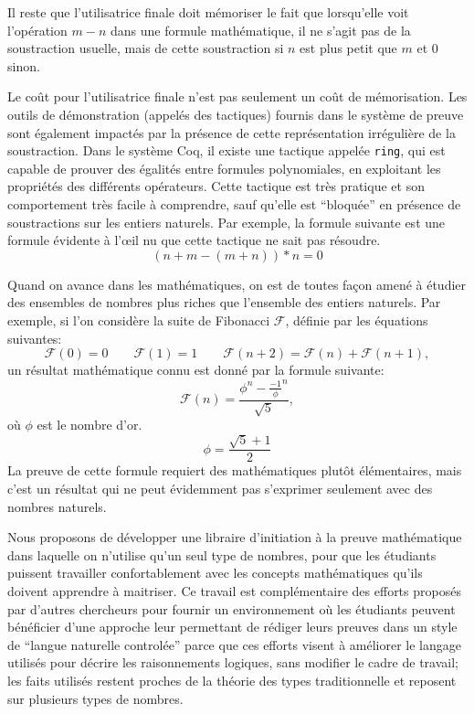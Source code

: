 \documentclass[draft]{jflart}
\begin{document}
Il reste que l'utilisatrice finale doit mémoriser le fait que
lorsqu'elle voit l'opération \(m - n\) dans une formule mathématique,
il ne s'agit pas de la soustraction usuelle, mais de cette
soustraction si \(n\) est plus petit que \(m\) et 0 sinon.

Le coût pour l'utilisatrice finale n'est pas seulement un coût de
mémorisation.  Les outils de démonstration (appelés des tactiques)
fournis dans le système de preuve sont également impactés par la
présence de cette représentation irrégulière de la soustraction.
Dans le système Coq, il existe une tactique appelée \texttt{ring}, qui
est capable de prouver des égalités entre formules polynomiales, en
exploitant les propriétés des différents opérateurs.  Cette tactique
est très pratique et son comportement très facile à comprendre, sauf
qu'elle est ``bloquée'' en présence de soustractions sur les entiers
naturels.  Par exemple, la formule suivante est une formule évidente à
l'œil nu que cette tactique ne sait pas résoudre.
\[(n + m - (m + n)) * n = 0\]

Quand on avance dans les mathématiques, on est de toutes façon amené à
étudier des ensembles de nombres plus riches que l'ensemble des
entiers naturels.  Par exemple, si l'on considère la suite de
Fibonacci \({\mathcal F}\), définie par les équations suivantes:
\[{\mathcal F}(0) = 0 \qquad {\mathcal F}(1)= 1\qquad {\mathcal F}(n +
2) = {\mathcal F}(n) + {\mathcal F}(n + 1),\]
un résultat mathématique connu est donné par la formule suivante:
\[{\mathcal F} (n) = \frac{\phi ^n - {\frac{-1}{\phi}} ^
  n}{\sqrt{5}},\]
où \(\phi\) est le nombre d'or.
\[\phi = \frac{\sqrt{5} + 1}{2}\]
La preuve de cette formule requiert des mathématiques plutôt
élémentaires, mais c'est un résultat qui ne peut évidemment pas s'exprimer
seulement avec des nombres naturels.

Nous proposons de développer une libraire d'initiation à la preuve
mathématique dans laquelle on n'utilise qu'un seul type de nombres,
pour que les étudiants puissent travailler confortablement avec les
concepts mathématiques qu'ils doivent apprendre à maitriser.  Ce
travail est complémentaire des efforts proposés par d'autres
chercheurs pour fournir un environnement où les étudiants peuvent
bénéficier d'une approche leur permettant de rédiger leurs preuves
dans un style de ``langue naturelle controlée'' parce que ces efforts
visent à améliorer le langage utilisés pour décrire les raisonnements
logiques, sans modifier le cadre de travail; les faits utilisés
restent proches de la théorie des types traditionnelle et reposent sur
plusieurs types de nombres.
\end{document}
